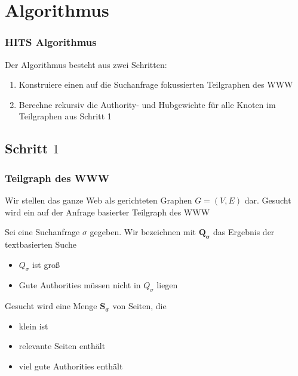 \documentclass[hyperref={pdfpagelabels=false}]{beamer}
\begin{document}
\section{Algorithmus}

\begin{frame}
\frametitle{HITS Algorithmus}
Der Algorithmus besteht aus zwei Schritten:
\begin{enumerate}
\item Konstruiere einen auf die Suchanfrage fokussierten Teilgraphen des WWW 
\item Berechne rekursiv die Authority- und Hubgewichte für alle Knoten im Teilgraphen aus Schritt 1
\end{enumerate}

\end{frame}


\subsection{Schritt $1$} 
\begin{frame}
\frametitle{Teilgraph des WWW}
Wir stellen das ganze Web als gerichteten Graphen $G=(V,E)$ dar. Gesucht wird ein auf der Anfrage basierter Teilgraph des WWW

\vspace{10pt}
Sei eine Suchanfrage $\sigma$ gegeben. Wir bezeichnen mit $\mathbf{Q_\sigma}$ das Ergebnis der textbasierten Suche
\begin{itemize}
\item $Q_\sigma$ ist groß
\item Gute Authorities müssen nicht in $Q_\sigma$ liegen
\end{itemize}

\vspace{10pt}

Gesucht wird eine Menge $\mathbf{S_\sigma}$ von Seiten, die
\begin{itemize}
\item klein ist
\item relevante Seiten enthält
\item viel gute Authorities enthält 
\end{itemize}
\end{frame}
\end{document}
